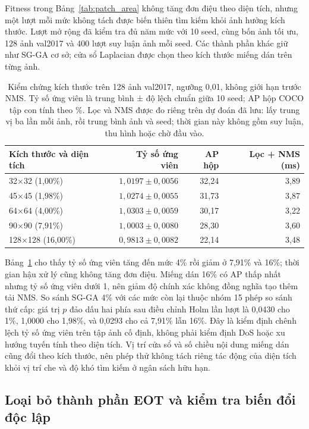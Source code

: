 \documentclass[a4paper,fleqn]{cas-dc}
\begin{document}
Fitness trong Bảng~\ref{tab:patch_area} không tăng đơn điệu theo diện tích, nhưng một lượt mỗi mức không tách được biến thiên tìm kiếm khỏi ảnh hưởng kích thước. Lượt mở rộng đã kiểm tra đủ năm mức với 10 seed, cùng bốn ảnh tối ưu, 128 ảnh val2017 và 400 lượt suy luận ảnh mỗi seed. Các thành phần khác giữ như SG-GA cơ sở; cửa sổ Laplacian được chọn theo kích thước miếng dán trên từng ảnh.

\begin{table}[t]
\centering
\small
\caption{Kiểm chứng kích thước trên 128 ảnh val2017, ngưỡng 0,01, không giới hạn trước NMS. Tỷ số ứng viên là trung bình ± độ lệch chuẩn giữa 10 seed; AP hộp COCO tập con tính theo \%. Lọc và NMS được đo riêng trên dự đoán đã lưu: lấy trung vị ba lần mỗi ảnh, rồi trung bình ảnh và seed; thời gian này không gồm suy luận, thu hình hoặc chờ đầu vào.}
\begin{tabularx}{\textwidth}{Xrrr}
\toprule
Kích thước và diện tích & Tỷ số ứng viên & AP hộp & Lọc + NMS (ms) \\
\midrule
32×32 (1,00\%) & $1{,}0197\pm0{,}0056$ & 32,24 & 3,89 \\
45×45 (1,98\%) & $1{,}0274\pm0{,}0055$ & 31,73 & 3,87 \\
64×64 (4,00\%) & $1{,}0303\pm0{,}0059$ & 30,17 & 3,22 \\
90×90 (7,91\%) & $1{,}0003\pm0{,}0080$ & 28,30 & 3,60 \\
128×128 (16,00\%) & $0{,}9813\pm0{,}0082$ & 22,14 & 3,48 \\
\bottomrule
\end{tabularx}
\label{tab:extended_area}
\end{table}

Bảng~\ref{tab:extended_area} cho thấy tỷ số ứng viên tăng đến mức 4\% rồi giảm ở 7,91\% và 16\%; thời gian hậu xử lý cũng không tăng đơn điệu. Miếng dán 16\% có AP thấp nhất nhưng tỷ số ứng viên dưới 1, nên giảm độ chính xác không đồng nghĩa tạo thêm tải NMS. So sánh SG-GA 4\% với các mức còn lại thuộc nhóm 15 phép so sánh thứ cấp: giá trị $p$ đảo dấu hai phía sau điều chỉnh Holm lần lượt là 0,0430 cho 1\%, 1,0000 cho 1,98\%, và 0,0293 cho cả 7,91\% lẫn 16\%. Đây là kiểm định chênh lệch tỷ số ứng viên trên tập ảnh cố định, không phải kiểm định DoS hoặc xu hướng tuyến tính theo diện tích. Vị trí cửa sổ và số chiều nội dung miếng dán cũng đổi theo kích thước, nên phép thử không tách riêng tác động của diện tích khỏi vị trí che và độ khó tìm kiếm ở ngân sách hữu hạn.

\subsection{Loại bỏ thành phần EOT và kiểm tra biến đổi độc lập}
\end{document}

